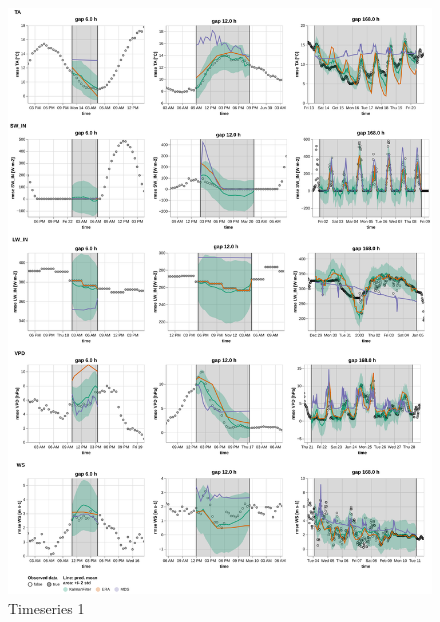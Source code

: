 \documentclass{article}
\newcommand{\imgwidth}{6in}
\begin{document}
\begin{figure}
\centerline{\includegraphics[width=\imgwidth]{timeseries_1_2}}
\caption{Timeseries 1}
\label{fig:ts_1_2}
\end{figure}
\end{document}
